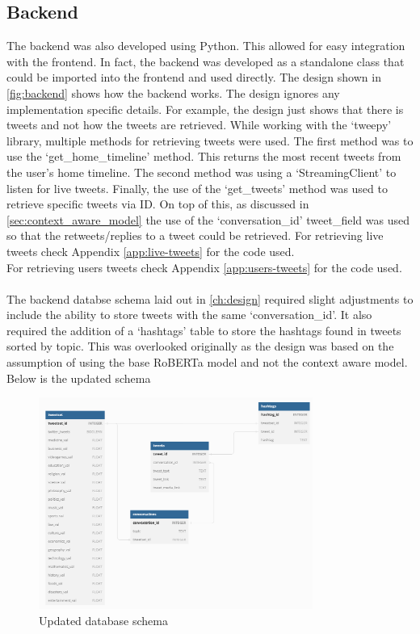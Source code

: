 \subsection{Backend}
The backend was also developed using Python. This allowed for easy integration with the frontend. In fact, the backend was developed as a standalone
class that could be imported into the frontend and used directly. The design shown in \cref{fig:backend} shows how the backend works. The design
ignores any implementation specific details. For example, the design just shows that there is tweets and not how the tweets are retrieved.
While working with the `tweepy' library, multiple methods for retrieving tweets were used. The first method was to use the `get\_home\_timeline'
method. This returns the most recent tweets from the user's home timeline. The second method was using a `StreamingClient' to listen for
live tweets. Finally, the use of the `get\_tweets' method was used to retrieve specific tweets via ID. On top of this, as discussed in \cref{sec:context_aware_model}
the use of the `conversation\_id' tweet\_field was used so that the retweets/replies to a tweet could be retrieved.
For retrieving live tweets check Appendix \ref{app:live-tweets} for the code used.\\
For retrieving users tweets check Appendix \ref{app:users-tweets} for the code used.\\\\
The backend databse schema laid out in \cref{ch:design} required slight adjustments to include the ability to store tweets with the same `conversation\_id'.
It also required the addition of a `hashtags' table to store the hashtags found in tweets sorted by topic.
This was overlooked originally as the design was based on the assumption of using the base RoBERTa model and not the context aware model.
Below is the updated schema
\begin{figure}[h]
    \centering
    \includegraphics[width=0.8\textwidth]{../images/updated-schema.png}
    \caption{Updated database schema}
    \label{fig:updated-schema}
\end{figure}

